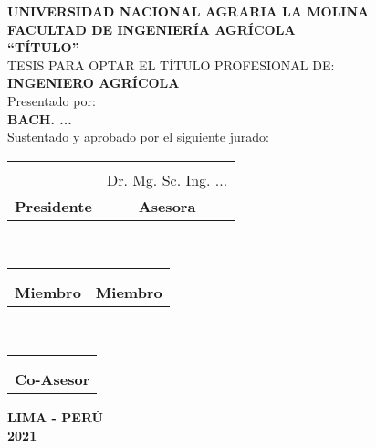 \begin{center}
\thispagestyle{empty}
 {\fontsize{18pt}{ \baselineskip}\selectfont \textbf{UNIVERSIDAD NACIONAL AGRARIA LA MOLINA}}\\[0.25cm]
 {\fontsize{16pt}{ \baselineskip}\selectfont \textbf{FACULTAD DE INGENIERÍA AGRÍCOLA}}\\[1cm]
 {\fontsize{16pt}{ \baselineskip}\selectfont \textbf{``TÍTULO''}}\\[0.5cm]
 {\fontsize{16pt}{ \baselineskip}\selectfont TESIS PARA OPTAR EL TÍTULO PROFESIONAL DE:}\\[0.5cm]
 {\fontsize{16pt}{ \baselineskip}\selectfont\textbf{INGENIERO AGRÍCOLA}}\\[0.5cm]
 {\fontsize{14pt}{ \baselineskip}\selectfont Presentado por:} \\[0.5cm]
 {\fontsize{16pt}{ \baselineskip}\selectfont \textbf{BACH. ...}}\\[0.5cm]
 {\fontsize{14pt}{ \baselineskip}\selectfont Sustentado y aprobado por el siguiente jurado:}\\[1cm]
\begin{minipage}{\linewidth}
\centering
\singlespacing
\begin{tabular}{cc}
\hrulefill & \hrulefill \\
 {\fontsize{10pt}{ \baselineskip}\selectfont{Dr. ...}} &  {\fontsize{10pt}{ \baselineskip}\selectfont Dr. Mg. Sc. Ing. ...} \\
\small{\textbf{Presidente}} & \small{\textbf{Asesora}}
\end{tabular}\\[1cm]
\begin{tabular}{cc}
\hrulefill & \hrulefill \\
{\fontsize{10pt}{ \baselineskip}\selectfont{Mg. Sc. ...}} & {\fontsize{10pt}{ \baselineskip}\selectfont{Mg. Sc. ...}} \\
\small{\textbf{Miembro}} & \small{\textbf{Miembro}}
\end{tabular}\\[1cm]
\begin{tabular}{c}
\hrulefill \\
{\fontsize{10pt}{ \baselineskip}\selectfont{Ing. ...}} \\
\small{\textbf{Co-Asesor}} 
\end{tabular}
\end{minipage}
\vfill
{\fontsize{14pt}{ \baselineskip}\selectfont \textbf{LIMA - PERÚ}}\\[0.5cm]
{\fontsize{14pt}{ \baselineskip}\selectfont \textbf{2021}}
\singlespacing
\end{center}